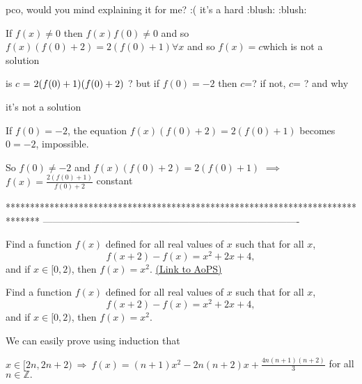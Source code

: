\begin{solution}
	\begin{tcolorbox}pco, would you mind explaining it for me?  :(  it's a hard :blush:  :blush: 
\begin{tcolorbox}If $ f(x)\ne 0 $ then $f(x)f(0)\ne 0$ and so $ f(x)(f(0)+2)=2(f(0)+1) \forall x $ and so $f(x)=c $which is not a solution\end{tcolorbox}
is $c$ = $2(f(0)+1) \/ (f(0)+2) $ ? but if $ f(0)= -2$ then $c$=?
if not, $c$= ? and why \begin{bolded}it's  not  a  solution\end{bolded}\end{tcolorbox}
If $f(0)=-2$, the equation $f(x)(f(0)+2)=2(f(0)+1)$ becomes $0=-2$, impossible.

So $f(0)\ne -2$ and $f(x)(f(0)+2)=2(f(0)+1)$ $\implies$ $f(x)=\frac{2(f(0)+1)}{f(0)+2}$ constant
\end{solution}
*******************************************************************************
-------------------------------------------------------------------------------

\begin{problem}
	Find a function $f(x)$ defined for all real values of $x$ such that for all $x$,
\[f(x+ 2) - f(x) = x^2 + 2x + 4,\]
and if $x \in [0, 2)$, then $f(x) = x^2.$
	\flushright \href{https://artofproblemsolving.com/community/c6h388769}{(Link to AoPS)}
\end{problem}



\begin{solution}
	\begin{tcolorbox}Find a function $f(x)$ defined for all real values of $x$ such that for all $x$,
\[f(x+ 2) - f(x) = x^2 + 2x + 4,\]
and if $x \in [0, 2)$, then $f(x) = x^2.$\end{tcolorbox}
We can easily prove using induction that 

$x \in [2n,2n+2) \: \Longrightarrow \: f(x)=(n+1)x^2-2n(n+2)x+\frac{4n(n+1)(n+2)}{3}$ for all $n \in \mathbb{Z}.$
\end{solution}



